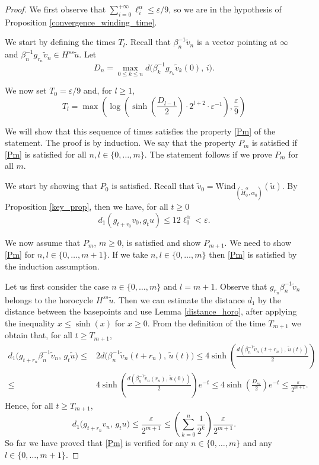 \documentclass[a4paper,english,reqno]{amsart}
\theoremstyle{definition}
\numberwithin{equation}{section}
\begin{document}
\begin{proof}
	We first observe that $\sum_{i=0}^{+\infty}\ell^{\alpha}_{i}\le \varepsilon/9$, so we are in the hypothesis of Proposition \ref{convergence_winding_time}.
	
	We start by defining the times $T_l$. 
	Recall that $\beta_n^{-1}\tilde v_n$ is a vector pointing at $\infty$
	and $\beta_n^{-1} g_{r_n}\tilde v_n \in H^{ss} \tilde u$.
	Let
	\[
	D_n = \max_{0 \le k \le n}
	d\big(\beta_k^{-1} g_{r_k}\tilde v_k(0),\, i\big).
	\]
	
	We now set $T_0 = \varepsilon/ 9$ and, for $l \ge 1$,
	\[
	T_l
	= \max \left(
	\log\!\left(
	\sinh\!\left(\frac{D_{l-1}}{2}\right)\cdot 2^{l+2} \cdot \varepsilon^{-1}
	\right), \frac{\varepsilon}{9} \right)
	\]
	
	We will show that this sequence of times satisfies the property \ref{Pm}
	of the statement.
	The proof is by induction. We say that the property $P_m$ is satisfied
	if \ref{Pm} is satisfied for all $n,l \in \{0,\dots,m\}$.
	The statement follows if we prove $P_m$ for all $m$.
	
	We start by showing that $P_0$ is satisfied.
	Recall that $\tilde v_0 = \mathrm{Wind}_{(\tilde H^{\alpha}_0, \alpha_0)}(\tilde u)$. By Proposition \ref{key_prop}, then we have, for all $t\ge 0$
	\[
	d_1(g_{t+r_0}v_0, g_t u) \le  12 \ell^{\alpha}_0 < \varepsilon.
	\]
	
	
	We now assume that $P_m$, $m\ge0$, is satisfied and show $P_{m+1}$. We need to show \ref{Pm} for $n,l\in \{0,\dots,m+1\}$. If we take $n,l\in \{0,\dots,m\}$ then \ref{Pm} is satisfied by the induction assumption.
	
	Let us first consider the case $n \in \{0,\dots,m\}$ and $l=m+1$. Observe that $g_{r_n} \beta_n^{-1}\tilde v_n$ belongs to the horocycle $H^{ss}\tilde u$. Then we can estimate the distance $d_1$ by the distance between the basepoints and use Lemma \ref{distance_horo}, after applying the inequality $x\le \sinh(x)$ for $x\ge0$. From the definition of the time $T_{m+1}$ we obtain that, for all $t\ge T_{m+1}$, 
	\begin{align*}
		d_1\big(g_{t+r_n} \beta_n^{-1} \tilde v_n,\, g_t \tilde u\big) \le & 
		2 d\big( \beta_n^{-1} \tilde v_n (t+r_n),\, \tilde u (t) \big) \le 
		4 \sinh (\frac{d( \beta_n^{-1} \tilde v_n (t+r_n),\, \tilde u (t) )}{2}) \\
		\le & 4 \sinh (\frac{d( \beta_n^{-1} \tilde v_n (r_n),\, \tilde u (0) )}{2}) e^{-t} \le 4 \sinh(\frac{D_m}{2}) e^{-t}	\le \frac{\varepsilon}{2^{m+1}}.	
	\end{align*}
Hence, for all $t\ge T_{m+1}$,
\[
d_1\big(g_{t+r_n} v_n,\, g_t u\big) \le \frac{\varepsilon}{2^{m+1}} \le \left(\sum_{k=0}^{n} \frac{1}{2^k}\right)\frac{\varepsilon}{2^{m+1}}.
\]
So far we have proved that \ref{Pm} is verified for any $n\in\{0,\dots,m\}$ and any $l\in \{0,\dots,m+1\}$. 


\end{proof}
\end{document}
